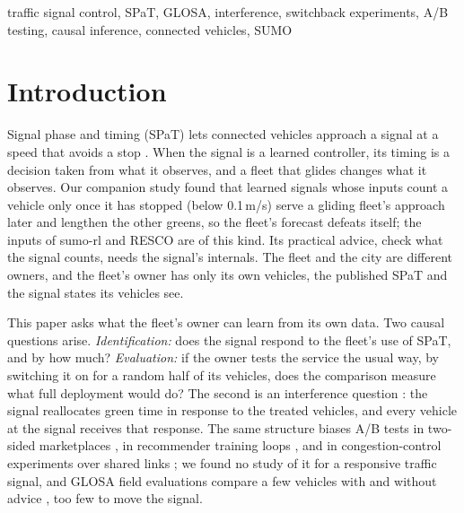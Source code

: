 \begin{IEEEkeywords}
traffic signal control, SPaT, GLOSA, interference, switchback experiments, A/B testing, causal inference, connected vehicles, SUMO
\end{IEEEkeywords}

\section{Introduction}\label{sec:intro}
Signal phase and timing (SPaT) lets connected vehicles approach a signal at a speed that avoids a stop \cite{katsaros2011,asadi2011}.
When the signal is a learned controller, its timing is a decision taken from what it observes, and a fleet that glides changes what
it observes. Our companion study \cite{nguyen2026tsi} found that learned signals whose inputs count a vehicle only once it has stopped
(below 0.1\,m/s) serve a gliding fleet's approach later and lengthen the other greens, so the fleet's forecast defeats itself; the
inputs of sumo-rl and RESCO \cite{ault2021} are of this kind. Its practical advice, check what the signal counts, needs the signal's
internals. The fleet and the city are different owners, and the fleet's owner has only its own vehicles, the published SPaT and the
signal states its vehicles see.

This paper asks what the fleet's owner can learn from its own data. Two causal questions arise. \emph{Identification:} does the signal
respond to the fleet's use of SPaT, and by how much? \emph{Evaluation:} if the owner tests the service the usual way, by switching it on
for a random half of its vehicles, does the comparison measure what full deployment would do? The second is an interference question
\cite{savje2021,hu2022,eckles2017}: the signal reallocates green time in response to the treated vehicles, and every vehicle at the
signal receives that response. The same structure biases A/B tests in two-sided marketplaces \cite{johari2022}, in recommender
training loops \cite{si2023,brennan2023}, and in congestion-control experiments over shared links \cite{spang2021}; we found no study of it
for a responsive traffic signal, and GLOSA field evaluations compare a few vehicles with and without advice \cite{stevanovic2013}, too few
to move the signal.

